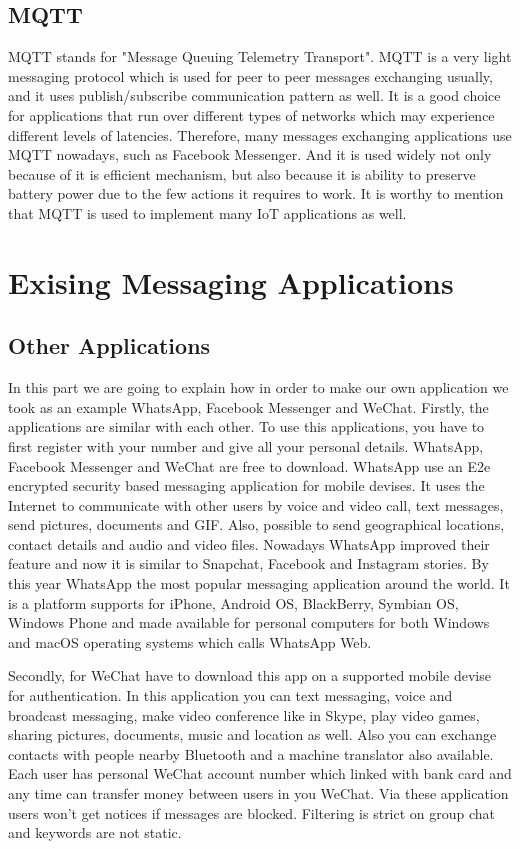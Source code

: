 \documentclass[11pt,a4paper]{report}
\begin{document}
\subsection{MQTT}
MQTT stands for "Message Queuing Telemetry Transport". MQTT is a very light messaging protocol which is used for peer to peer messages exchanging usually, and it uses publish/subscribe communication pattern as well. It is a good choice for applications that run over different types of networks which may experience different levels of latencies. Therefore, many messages exchanging applications use MQTT nowadays, such as Facebook Messenger. And it is used widely not only because of it is efficient mechanism, but also because it is ability to preserve battery power due to the few actions it requires to work. It is worthy to mention that MQTT is used to implement many IoT applications as well.

\section{Exising Messaging Applications}

\subsection{Other Applications}
In this part we are going to explain how in order to make our own application we took as an example WhatsApp, Facebook Messenger and WeChat.
Firstly, the applications are similar with each other. To use this applications, you have to first register with your number and give all your personal details. WhatsApp, Facebook Messenger and WeChat are free to download. WhatsApp use an E2e encrypted security based messaging application for mobile devises.  It uses the Internet to communicate with other users by voice and video call, text messages, send pictures, documents and GIF. Also, possible to send geographical locations, contact details and audio and video files. Nowadays WhatsApp improved their feature and now it is similar to Snapchat, Facebook and Instagram stories. By this year WhatsApp the most popular messaging application around the world. It is a platform supports for iPhone, Android OS, BlackBerry, Symbian OS, Windows Phone and made available for personal computers for both Windows and macOS operating systems which calls WhatsApp Web.

Secondly, for WeChat have to download this app on a supported mobile devise for authentication. In this application you can text messaging, voice and broadcast messaging, make video conference like in Skype, play video games, sharing pictures, documents, music and location as well. Also you can exchange contacts with people nearby Bluetooth and a machine translator also available. Each user has personal WeChat account number which linked with bank card and any time can transfer money between users in you WeChat. Via these application users won’t get notices if messages are blocked. Filtering is strict on group chat and keywords are not static.
\end{document}
